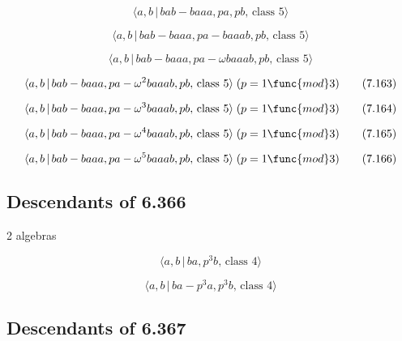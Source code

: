 \documentclass[10pt]{article}
\begin{document}
\begin{equation}
\langle a,b\,|\,bab-baaa,pa,pb,\,\text{class }5\rangle  \tag{7.160}
\end{equation}

\begin{equation}
\langle a,b\,|\,bab-baaa,pa-baaab,pb,\,\text{class }5\rangle  \tag{7.161}
\end{equation}

\begin{equation}
\langle a,b\,|\,bab-baaa,pa-\omega baaab,pb,\,\text{class }5\rangle 
\tag{7.162}
\end{equation}

\begin{equation}
\langle a,b\,|\,bab-baaa,pa-\omega ^{2}baaab,pb,\,\text{class }5\rangle
\;(p=1\func{mod}3)  \tag{7.163}
\end{equation}

\begin{equation}
\langle a,b\,|\,bab-baaa,pa-\omega ^{3}baaab,pb,\,\text{class }5\rangle
\;(p=1\func{mod}3)  \tag{7.164}
\end{equation}

\begin{equation}
\langle a,b\,|\,bab-baaa,pa-\omega ^{4}baaab,pb,\,\text{class }5\rangle
\;(p=1\func{mod}3)  \tag{7.165}
\end{equation}

\begin{equation}
\langle a,b\,|\,bab-baaa,pa-\omega ^{5}baaab,pb,\,\text{class }5\rangle
\;(p=1\func{mod}3)  \tag{7.166}
\end{equation}

\subsection{Descendants of 6.366}

2 algebras

\begin{equation}
\langle a,b\,|\,ba,p^3b,\,\text{class }4\rangle  \tag{7.167}
\end{equation}

\begin{equation}
\langle a,b\,|\,ba-p^3a,p^3b,\,\text{class }4\rangle  \tag{7.168}
\end{equation}

\subsection{Descendants of 6.367}
\end{document}
